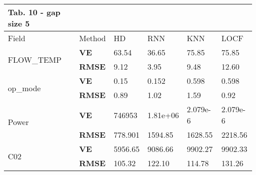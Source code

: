 \documentclass[9.5pt,article,twocolumn]{article}
\begin{document}
{{\begin{tabular}{llllll}
\textbf{Tab. 10 -} gap size 5
\\
\hline
\multicolumn{1}{l}{Field}   & Method & HD & RNN & KNN & LOCF \\
\hline
\multirow{2}{*}{FLOW\_TEMP}       & \textbf{VE}   & 63.54   & 36.65       & 75.85       & 75.85       \\
                                  & \textbf{RMSE} & 9.12    & 3.95        & 9.48        & 12.60       \\
\multirow{2}{*}{op\_mode}         & \textbf{VE}   & 0.15    & 0.152       & 0.598       & 0.598       \\
                                  & \textbf{RMSE} & 0.89    & 1.02        & 1.59        & 0.92        \\
\multirow{2}{*}{Power}            & \textbf{VE}   & 746953  & 1.81e+06 & 2.079e-6 &  2.079e-6 \\
                                  & \textbf{RMSE} & 778.901 & 1594.85     & 1628.55     & 2218.56     \\
\multirow{2}{*}{C02}              & \textbf{VE}   & 5956.65 & 9086.66     & 9902.27     & 9902.33     \\
                                  & \textbf{RMSE} & 105.32  & 122.10      & 114.78      & 131.26      \\
\hline           
\end{tabular}
}


}
\end{document}
